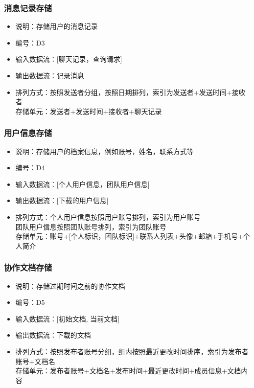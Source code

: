             \subsubsection{消息记录存储}
            \begin{itemize}
                \item 说明：存储用户的消息记录
                \item 编号：D3
                \item 输入数据流：[聊天记录，查询请求]
                \item 输出数据流：记录消息
                \item 排列方式：按照发送者分组，按照日期排列，索引为发送者+发送时间+接收者\\
                         存储单元：发送者+发送时间+接收者+聊天记录\\
            \end{itemize}
            \subsubsection{用户信息存储}
            \begin{itemize}
                \item 说明：存储用户的档案信息，例如账号，姓名，联系方式等
                \item 编号：D4
                \item 输入数据流：[个人用户信息，团队用户信息]
                \item 输出数据流：[下载的用户信息]
                \item 排列方式：个人用户信息按照用户账号排列，索引为用户账号\\
                               团队用户信息按照团队账号排列，索引为团队账号\\
                               存储单元：账号+[个人标识，团队标识]+联系人列表+头像+邮箱+手机号+个人简介\\
            \end{itemize}
            \subsubsection{协作文档存储}
            \begin{itemize}
                \item 说明：存储过期时间之前的协作文档
                \item 编号：D5
                \item 输入数据流：[初始文档, 当前文档]
                \item 输出数据流：下载的文档
                \item 排列方式：按照发布者账号分组，组内按照最近更改时间排序，索引为发布者账号+文档名\\
                         存储单元：发布者账号+文档名+发布时间+最近更改时间+成员信息+文档内容\\
            \end{itemize}
